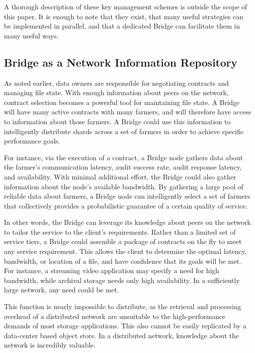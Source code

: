 \documentclass[a4paper,10pt]{article}
\begin{document}
A thorough description of these key management schemes is outside the scope of this paper. It is enough to note that they exist, that many useful strategies can be implemented in parallel, and that a dedicated Bridge can facilitate them in many useful ways.

\subsection{Bridge as a Network Information Repository}
As noted earlier, data owners are responsible for negotiating contracts and managing file state. With enough information about peers on the network, contract selection becomes a powerful tool for maintaining file state. A Bridge will have many active contracts with many farmers, and will therefore have access to information about those farmers. A Bridge could use this information to intelligently distribute shards across a set of farmers in order to achieve specific performance goals.

For instance, via the execution of a contract, a Bridge node gathers data about the farmer’s communication latency, audit success rate, audit response latency, and availability. With minimal additional effort, the Bridge could also gather information about the node’s available bandwidth. By gathering a large pool of reliable data about farmers, a Bridge node can intelligently select a set of farmers that collectively provides a probabilistic guarantee of a certain quality of service.

In other words, the Bridge can leverage its knowledge about peers on the network to tailor the service to the client’s requirements. Rather than a limited set of service tiers, a Bridge could assemble a package of contracts on the fly to meet any service requirement. This allows the client to determine the optimal latency, bandwidth, or location of a file, and have confidence that its goals will be met. For instance, a streaming video application may specify a need for high bandwidth, while archival storage needs only high availability. In a sufficiently large network, any need could be met.

This function is nearly impossible to distribute, as the retrieval and processing overhead of a distributed network are unsuitable to the high-performance demands of most storage applications. This also cannot be easily replicated by a data-center based object store. In a distributed network, knowledge about the network is incredibly valuable.
\end{document}
